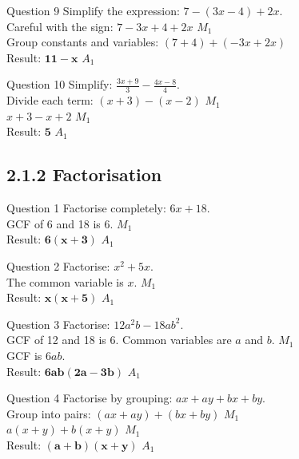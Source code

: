 \documentclass[12pt, a4paper, oneside]{article}
\begin{document}
\begin{solvingbox}{Question 9}
Simplify the expression: $7 - (3x - 4) + 2x$. \\
Careful with the sign: $7 - 3x + 4 + 2x$ \hfill $M_1$ \\
Group constants and variables: $(7 + 4) + (-3x + 2x)$ \\
Result: $\mathbf{11 - x}$ \hfill $A_1$
\end{solvingbox}

\begin{solvingbox}{Question 10}
Simplify: $\frac{3x + 9}{3} - \frac{4x - 8}{4}$. \\
Divide each term: $(x + 3) - (x - 2)$ \hfill $M_1$ \\
$x + 3 - x + 2$ \hfill $M_1$ \\
Result: $\mathbf{5}$ \hfill $A_1$
\end{solvingbox}

\newpage
\subsection*{2.1.2 Factorisation}

\begin{solvingbox}{Question 1}
Factorise completely: $6x + 18$. \\
GCF of 6 and 18 is 6. \hfill $M_1$ \\
Result: $\mathbf{6(x + 3)}$ \hfill $A_1$
\end{solvingbox}

\begin{solvingbox}{Question 2}
Factorise: $x^2 + 5x$. \\
The common variable is $x$. \hfill $M_1$ \\
Result: $\mathbf{x(x + 5)}$ \hfill $A_1$
\end{solvingbox}

\begin{solvingbox}{Question 3}
Factorise: $12a^2b - 18ab^2$. \\
GCF of 12 and 18 is 6. Common variables are $a$ and $b$. \hfill $M_1$ \\
GCF is $6ab$. \\
Result: $\mathbf{6ab(2a - 3b)}$ \hfill $A_1$
\end{solvingbox}

\begin{solvingbox}{Question 4}
Factorise by grouping: $ax + ay + bx + by$. \\
Group into pairs: $(ax + ay) + (bx + by)$ \hfill $M_1$ \\
$a(x + y) + b(x + y)$ \hfill $M_1$ \\
Result: $\mathbf{(a + b)(x + y)}$ \hfill $A_1$
\end{solvingbox}
\end{document}
